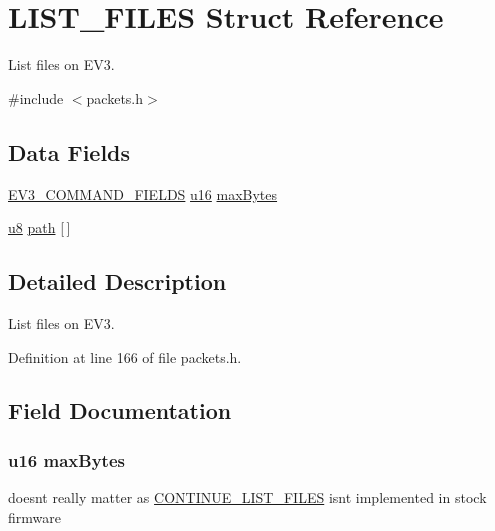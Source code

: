 \hypertarget{struct_l_i_s_t___f_i_l_e_s}{}\section{L\+I\+S\+T\+\_\+\+F\+I\+L\+E\+S Struct Reference}
\label{struct_l_i_s_t___f_i_l_e_s}


List files on E\+V3.  




{\ttfamily \#include $<$packets.\+h$>$}

\subsection*{Data Fields}
\begin{DoxyCompactItemize}
\item 
\hyperlink{packets_8h_a0c26a010ef0da2962a751796943824c9}{E\+V3\+\_\+\+C\+O\+M\+M\+A\+N\+D\+\_\+\+F\+I\+E\+L\+D\+S} \hyperlink{defs_8h_ace9d960e74685e2cd84b36132dbbf8aa}{u16} \hyperlink{struct_l_i_s_t___f_i_l_e_s_ab90bb8e65738c294ff6c9400ea3f4b41}{max\+Bytes}
\item 
\hyperlink{defs_8h_a92c50087ca0e64fa93fc59402c55f8ca}{u8} \hyperlink{struct_l_i_s_t___f_i_l_e_s_a5b52bf017932056c1f97b175be6bd8b1}{path} \mbox{[}$\,$\mbox{]}
\end{DoxyCompactItemize}


\subsection{Detailed Description}
List files on E\+V3. 

Definition at line 166 of file packets.\+h.



\subsection{Field Documentation}
\hypertarget{struct_l_i_s_t___f_i_l_e_s_ab90bb8e65738c294ff6c9400ea3f4b41}{}
\subsubsection[{max\+Bytes}]{ {\bf u16} max\+Bytes}\label{struct_l_i_s_t___f_i_l_e_s_ab90bb8e65738c294ff6c9400ea3f4b41}
doesn\textquotesingle{}t really matter as \hyperlink{struct_c_o_n_t_i_n_u_e___l_i_s_t___f_i_l_e_s}{C\+O\+N\+T\+I\+N\+U\+E\+\_\+\+L\+I\+S\+T\+\_\+\+F\+I\+L\+E\+S} isn\textquotesingle{}t implemented in stock firmware 

